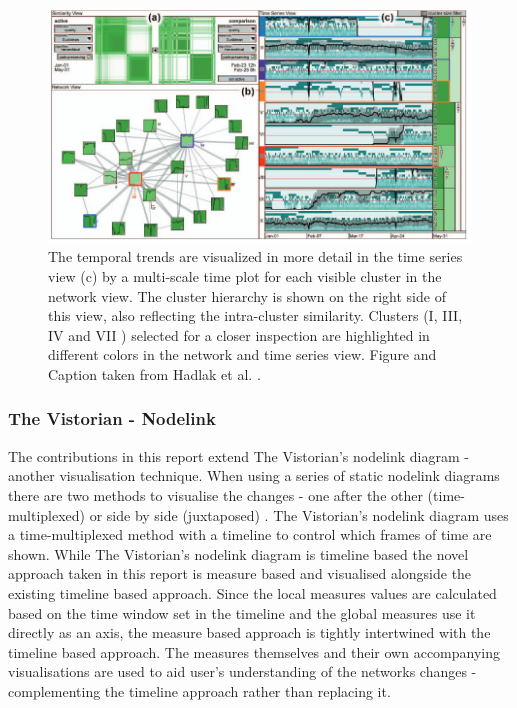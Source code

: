 \begin{figure}[H]
  \begin{center}
  \includegraphics[trim={0 0 0 0}, width=140mm]{./Figures/hadlakClusteredTrends.png}
  \caption{The temporal trends are visualized in more detail in the time series view (c) by a multi-scale time plot for each visible cluster in the network view. The cluster hierarchy is shown on the right side of this view, also reflecting the intra-cluster similarity. Clusters (I, III, IV and VII ) selected for a closer inspection are highlighted in different colors in the network and time series view.\newline
  Figure and Caption taken from Hadlak et al. \cite{dynamicTrend}.}
  \label{fig:hadlakClusteredTrends}
  \end{center}
\end{figure}


\subsubsection*{The Vistorian - Nodelink}
The contributions in this report extend The Vistorian's nodelink diagram - another visualisation technique. When using a series of static nodelink diagrams there are two methods to visualise the changes - one after the other (time-multiplexed) or side by side (juxtaposed) \cite{vdnwmc}. The Vistorian's nodelink diagram uses a time-multiplexed method with a timeline to control which frames of time are shown. While The Vistorian's nodelink diagram is timeline based the novel approach taken in this report is measure based and visualised alongside the existing timeline based approach. Since the local measures values are calculated based on the time window set in the timeline and the global measures use it directly as an axis, the measure based approach is tightly intertwined with the timeline based approach. The measures themselves and their own accompanying visualisations are used to aid user's understanding of the networks changes - complementing the  timeline approach rather than replacing it.

